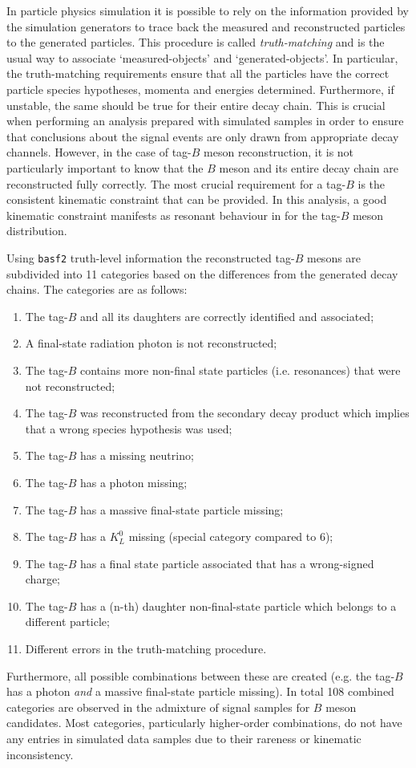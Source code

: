 In particle physics simulation it is possible to rely on the information provided by the simulation generators to trace back the measured and reconstructed particles to the generated particles.
This procedure is called \textit{truth-matching} and is the usual way to associate `measured-objects' and `generated-objects'.
In particular, the truth-matching requirements ensure that all the particles have the correct particle species hypotheses, momenta and energies determined.
Furthermore, if unstable, the same should be true for their entire decay chain.
This is crucial when performing an analysis prepared with simulated samples in order to ensure that conclusions about the signal events are only drawn from appropriate decay channels.
However, in the case of tag-$B$ meson reconstruction, it is not particularly important to know that the $B$ meson and its entire decay chain are reconstructed fully correctly.
The most crucial requirement for a tag-$B$ is the consistent kinematic constraint that can be provided.
In this analysis, a good kinematic constraint manifests as resonant behaviour in \Mbc for the tag-$B$ meson distribution.

Using \texttt{basf2} truth-level information the reconstructed tag-$B$ mesons are subdivided into 11 categories based on the differences from the generated decay chains.
The categories are as follows:
\begin{enumerate}
    \setcounter{enumi}{0}
    \item The tag-$B$ and all its daughters are correctly identified and associated;
    \item A final-state radiation photon is not reconstructed;
    \item The tag-$B$ contains more non-final state particles (i.e. resonances) that were not reconstructed;
    \item The tag-$B$ was reconstructed from the secondary decay product which implies that a wrong species hypothesis was used;
    \item The tag-$B$ has a missing neutrino;
    \item The tag-$B$ has a photon missing;
    \item The tag-$B$ has a massive final-state particle missing;
    \item The tag-$B$ has a $K_L^0$ missing (special category compared to 6);
    \item The tag-$B$ has a final state particle associated that has a wrong-signed charge;
    \item The tag-$B$ has a (n-th) daughter non-final-state particle which belongs to a different particle;
    \item Different errors in the truth-matching procedure.
\end{enumerate}
Furthermore, all possible combinations between these are created (e.g. the tag-$B$ has a photon \textit{and} a massive final-state particle missing).
In total 108 combined categories are observed in the admixture of \BtoXsgamma signal \MC samples for $B$ meson candidates.
Most categories, particularly higher-order combinations, do not have any entries in simulated data samples due to their rareness or kinematic inconsistency.


